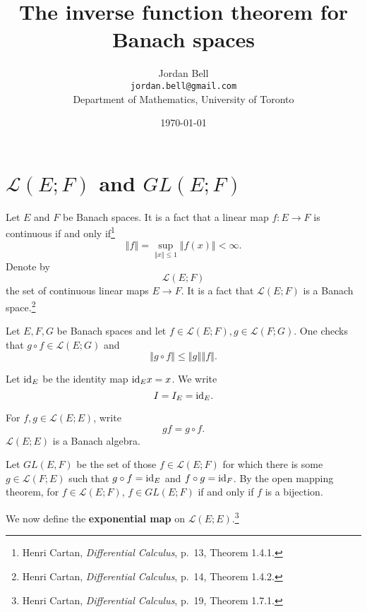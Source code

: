 \documentclass{article}
\newcommand{\id}{\ensuremath\mathrm{id}}
\newcommand{\norm}[1]{\left\Vert #1 \right\Vert}
\theoremstyle{definition}
\begin{document}
\title{The inverse function theorem for Banach spaces}
\author{Jordan Bell\\ \texttt{jordan.bell@gmail.com}\\Department of Mathematics, University of Toronto}
\date{\today}

\maketitle

\section{$\mathscr{L}(E;F)$ and $GL(E;F)$}
Let $E$ and $F$ be Banach spaces.
It is a fact that a linear map $f:E \to F$ is continuous if and only if\footnote{Henri Cartan, {\em Differential Calculus}, p.~13, Theorem 1.4.1.} 
\[
\norm{f} = \sup_{\norm{x} \leq 1} \norm{f(x)}<\infty.
\]
Denote by
\[
\mathscr{L}(E;F)
\]
the set of continuous linear maps $E \to F$. It is a fact that $\mathscr{L}(E;F)$ is a Banach
space.\footnote{Henri Cartan, {\em Differential Calculus}, p.~14, Theorem 1.4.2.} 

Let $E,F,G$ be Banach spaces and let $f \in \mathscr{L}(E;F), g \in \mathscr{L}(F;G)$. One checks that $g \circ f \in \mathscr{L}(E;G)$ and
\[
\norm{g \circ f} \leq \norm{g} \norm{f}.
\]

Let $\id_E$ be the identity map $\id_E x = x$.
We write 
\[
I=I_E=\id_E.
\]

For $f,g \in \mathscr{L}(E;E)$, write
\[
gf = g \circ f.
\]
$\mathscr{L}(E;E)$ is a Banach algebra.



Let $GL(E,F)$ be the set of those $f \in \mathscr{L}(E;F)$ for which there is some $g \in \mathscr{L}(F;E)$
such that $g \circ  f = \id_E$ and $f \circ  g = \id_F$. 
By the open mapping theorem, for $f \in \mathscr{L}(E;F)$, $f \in GL(E;F)$ if and only if $f$ is a bijection.



We now define the \textbf{exponential map} on $\mathscr{L}(E;E)$.\footnote{Henri Cartan, {\em Differential Calculus}, p.~19, Theorem 1.7.1.}
\end{document}
